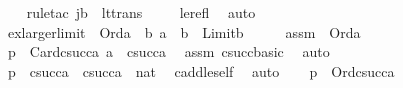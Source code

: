 \begin{isabellebody}
%
\isadelimproof
\ \ %
\endisadelimproof
%
\isatagproof
{}\isamarkupfalse%
\ {\isacharparenleft}{\kern0pt}rule{\isacharunderscore}{\kern0pt}tac\ j{\isacharequal}{\kern0pt}b\ \ lt{\isacharunderscore}{\kern0pt}trans{\isacharparenright}{\kern0pt}\ \isanewline
\ \ \isamarkupfalse%
\ le{\isacharunderscore}{\kern0pt}refl\ \isamarkupfalse%
\ auto%
\endisatagproof
{\isafoldproof}%
%
\isadelimproof
\isanewline
%
\endisadelimproof
\ \ \ \ \isanewline
\isanewline
{}\isamarkupfalse%
\ ex{\isacharunderscore}{\kern0pt}larger{\isacharunderscore}{\kern0pt}limit\ {\isacharcolon}{\kern0pt}\ {\isachardoublequoteopen}Ord{\isacharparenleft}{\kern0pt}a{\isacharparenright}{\kern0pt}\ {\isasymLongrightarrow}\ {\isasymexists}b{\isachardot}{\kern0pt}\ a\ {\isacharless}{\kern0pt}\ b\ {\isasymand}\ Limit{\isacharparenleft}{\kern0pt}b{\isacharparenright}{\kern0pt}{\isachardoublequoteclose}\isanewline
%
\isadelimproof
%
\endisadelimproof
%
\isatagproof
{}\isamarkupfalse%
\ {\isacharminus}{\kern0pt}\isanewline
\ \ \isamarkupfalse%
\ assm\ {\isacharcolon}{\kern0pt}\ {\isachardoublequoteopen}Ord{\isacharparenleft}{\kern0pt}a{\isacharparenright}{\kern0pt}{\isachardoublequoteclose}\isanewline
\ \ \isamarkupfalse%
\ p{}\ {\isacharcolon}{\kern0pt}\ {\isachardoublequoteopen}Card{\isacharparenleft}{\kern0pt}csucc{\isacharparenleft}{\kern0pt}a{\isacharparenright}{\kern0pt}{\isacharparenright}{\kern0pt}{\isachardoublequoteclose}\ {\isachardoublequoteopen}a\ {\isacharless}{\kern0pt}\ csucc{\isacharparenleft}{\kern0pt}a{\isacharparenright}{\kern0pt}{\isachardoublequoteclose}\ \isamarkupfalse%
\ assm\ csucc{\isacharunderscore}{\kern0pt}basic\ \isamarkupfalse%
\ auto\isanewline
\ \ \isamarkupfalse%
\ \isamarkupfalse%
\ p{}\ {\isacharcolon}{\kern0pt}\ {\isachardoublequoteopen}csucc{\isacharparenleft}{\kern0pt}a{\isacharparenright}{\kern0pt}\ {\isasymle}\ {\isacharparenleft}{\kern0pt}csucc{\isacharparenleft}{\kern0pt}a{\isacharparenright}{\kern0pt}\ {\isasymoplus}\ nat{\isacharparenright}{\kern0pt}{\isachardoublequoteclose}\ \isamarkupfalse%
\ cadd{\isacharunderscore}{\kern0pt}le{\isacharunderscore}{\kern0pt}self\ \isamarkupfalse%
\ auto\isanewline
\ \ \isamarkupfalse%
\ p{}\ {\isacharcolon}{\kern0pt}\ {\isachardoublequoteopen}Ord{\isacharparenleft}{\kern0pt}csucc{\isacharparenleft}{\kern0pt}a{\isacharparenright}{\kern0pt}{\isacharparenright}{\kern0pt}{\isachardoublequoteclose}\ \isamarkupfalse%

\end{isabellebody}

